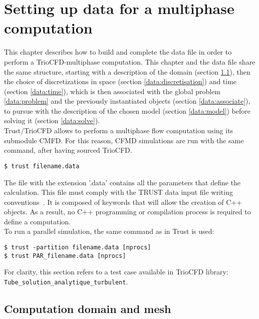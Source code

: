 \chapter{Setting up data for a multiphase computation}\label{dataset}
This chapter describes how to build and complete the data file in order to perform a TrioCFD-multiphase computation. This chapter and the data file share the same structure, starting with a description of the domain (section \ref{data:domaine}), then the choice of discretizations in space (section \ref{data:discretisation}) and time (section \ref{data:time}), which is then associated with the global problem \ref{data:problem} and the previously instantiated objects (section \ref{data:associate}), to pursue with the description of the chosen model (section \ref{data:model}) before solving it (section \ref{data:solve}). \\

Trust/TrioCFD allows to perform a multiphase flow computation using its submodule CMFD. For this reason, CFMD simulations are run with the same command, after having sourced TrioCFD.
\begin{verbatim}
$ trust filename.data
\end{verbatim}
The file with the extension '.data' contains all the parameters that define the calculation. This file must comply with the TRUST data input file writing conventions~\cite{trustonline}. It is composed of keywords that will allow the creation of C++ objects. As a result, no C++ programming or compilation process is required to define a computation. \\
To run a parallel simulation, the same command as in Trust is used:
\begin{verbatim}
$ trust -partition filename.data [nprocs]
$ trust PAR_filename.data [nprocs]
\end{verbatim}
For clarity, this section refers to a test case available in TrioCFD library: \texttt{Tube_solution_analytique_turbulent}.

\section{Computation domain and mesh} \label{data:domaine}

